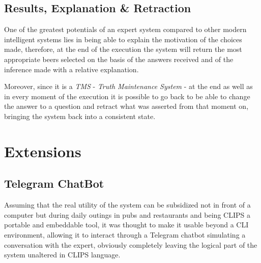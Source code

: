 \documentclass[12pt]{article}
\begin{document}
\subsection{Results, Explanation \& Retraction}

One of the greatest potentials of an expert system compared to other modern intelligent systems lies in being able to explain the motivation of the choices made, therefore, at the end of the execution the system will return the most appropriate beers selected on the basis of the answers received and of the inference made with a relative explanation.

Moreover, since it is a \textit{TMS} - \textit{Truth Maintenance System} - at the end as well as in every moment of the execution it is possible to go back to be able to change the answer to a question and retract what was asserted from that moment on, bringing the system back into a consistent state.

\newpage
\section{Extensions}

\subsection{Telegram ChatBot}
Assuming that the real utility of the system can be subsidized not in front of a computer but during daily outings in pubs and restaurants and being CLIPS a portable and embeddable tool, it was thought to make it usable beyond a CLI environment, allowing it to interact through a Telegram chatbot simulating a conversation with the expert, obviously completely leaving the logical part of the system unaltered in CLIPS language.
\end{document}

